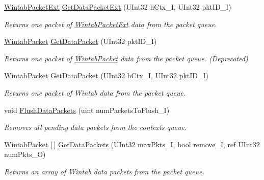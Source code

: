 \begin{DoxyCompactItemize}
\mbox{\hyperlink{struct_wintab_d_n_1_1_wintab_packet_ext}{Wintab\+Packet\+Ext}} \mbox{\hyperlink{class_wintab_d_n_1_1_c_wintab_data_a0849e716235d77de44c182fd6b8e46c4}{Get\+Data\+Packet\+Ext}} (U\+Int32 h\+Ctx\+\_\+I, U\+Int32 pkt\+I\+D\+\_\+I)
\begin{DoxyCompactList}\small\item\em Returns one packet of \mbox{\hyperlink{struct_wintab_d_n_1_1_wintab_packet_ext}{Wintab\+Packet\+Ext}} data from the packet queue. \end{DoxyCompactList}\item 
\mbox{\hyperlink{struct_wintab_d_n_1_1_wintab_packet}{Wintab\+Packet}} \mbox{\hyperlink{class_wintab_d_n_1_1_c_wintab_data_a2c117ceaa2a2db38f99e47549897b6d5}{Get\+Data\+Packet}} (U\+Int32 pkt\+I\+D\+\_\+I)
\begin{DoxyCompactList}\small\item\em Returns one packet of \mbox{\hyperlink{struct_wintab_d_n_1_1_wintab_packet}{Wintab\+Packet}} data from the packet queue. (Deprecated) \end{DoxyCompactList}\item 
\mbox{\hyperlink{struct_wintab_d_n_1_1_wintab_packet}{Wintab\+Packet}} \mbox{\hyperlink{class_wintab_d_n_1_1_c_wintab_data_a13dd62c752065f17025bf804a22d8cbf}{Get\+Data\+Packet}} (U\+Int32 h\+Ctx\+\_\+I, U\+Int32 pkt\+I\+D\+\_\+I)
\begin{DoxyCompactList}\small\item\em Returns one packet of Wintab data from the packet queue. \end{DoxyCompactList}\item 
void \mbox{\hyperlink{class_wintab_d_n_1_1_c_wintab_data_ae571e727ce74aa3a5f22a832f242085b}{Flush\+Data\+Packets}} (uint num\+Packets\+To\+Flush\+\_\+I)
\begin{DoxyCompactList}\small\item\em Removes all pending data packets from the context\textquotesingle{}s queue. \end{DoxyCompactList}\item 
\mbox{\hyperlink{struct_wintab_d_n_1_1_wintab_packet}{Wintab\+Packet}} \mbox{[}$\,$\mbox{]} \mbox{\hyperlink{class_wintab_d_n_1_1_c_wintab_data_af444201f4a176ebe322b4fa473621a19}{Get\+Data\+Packets}} (U\+Int32 max\+Pkts\+\_\+I, bool remove\+\_\+I, ref U\+Int32 num\+Pkts\+\_\+O)
\begin{DoxyCompactList}\small\item\em Returns an array of Wintab data packets from the packet queue. \end{DoxyCompactList}\end{DoxyCompactItemize}
